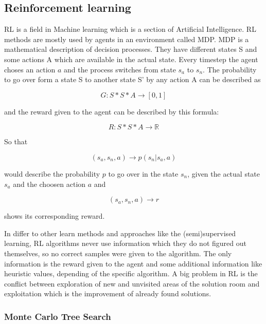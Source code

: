 \subsection{Reinforcement learning} 
 
\ac{RL} is a field in Machine learning which is a section of Artificial Intelligence. \ac{RL} methods are mostly used by agents in an environment called \ac{MDP}. \ac{MDP} is a mathematical description of decision processes. They have different states S and some actions A which are available in the actual state. Every timestep the agent choses an action $a$ and the process switches from state $s_a$ to $s_n$. The probability to go over form a state S to another state S' by any action A can be described as

\begin{equation}
	G: S*S*A \rightarrow [0,1] 
\end{equation}

and the reward given to the agent can be described by this formula:

\begin{equation}
	R: S*S*A \rightarrow \mathbb{R}
\end{equation}

So that

\begin{equation}
	(s_a, s_n, a) \rightarrow p(s_n|s_a, a)
\end{equation}

would describe the probability $p$ to go over in the state $s_n$, given the actual state $s_a$ and the choosen action $a$ and 

\begin{equation}
	(s_a, s_n, a) \rightarrow r
\end{equation}

shows its corresponding reward.  


In differ to other learn methods and approaches like the (semi)supervised learning, RL algorithms never use information which they do not figured out themselves, so no correct samples were given to the algorithm. The only information is the reward given to the agent and some additional information like heuristic values, depending of the specific algorithm. 
A big problem in \ac{RL} is the conflict between exploration of new and unvisited areas of the solution room and exploitation which is the improvement of already found solutions.

\subsubsection{Monte Carlo Tree Search} 

